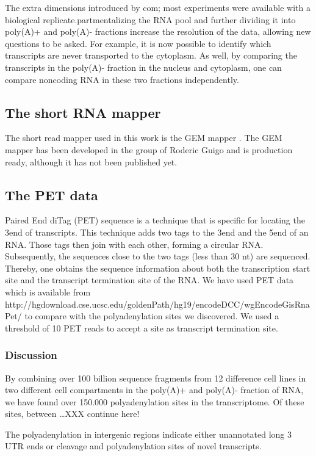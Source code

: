 The extra dimensions introduced by com; most experiments were
available with a biological replicate.partmentalizing the RNA pool and further
dividing it into poly(A)+ and poly(A)- fractions increase the resolution of the
data, allowing new questions to be asked. For example, it is now possible to
identify which transcripts are never transported to the cytoplasm. As well, by
comparing the transcripts in the poly(A)- fraction in the nucleus and
cytoplasm, one can compare noncoding RNA in these two fractions independently. 

\subsection{The short RNA mapper}
The short read mapper used in this work is the GEM mapper
\cite{ribeca_gem_2010}. The GEM mapper has been developed in the group of
Roderic Guigo and is production ready, although it has not been published yet.

\subsection{The PET data}
Paired End diTag (PET) sequence is a technique that is specific for locating
the 3\p end of transcripts. This technique adds two tags to the 3\p end and the
5\p end of an RNA. Those tags then join with each other, forming a circular
RNA. Subsequently, the sequences close to the two tags (less than 30 nt) are
sequenced. Thereby, one obtains the sequence information about both the
transcription start site and the transcript termination site of the RNA. We
have used PET data which is available from
http://hgdownload.cse.ucsc.edu/goldenPath/hg19/encodeDCC/wgEncodeGisRnaPet/ to
compare with the polyadenylation sites we discovered. We used a threshold of 10
PET reads to accept a site as transcript termination site.

\subsubsection{Discussion}
By combining over 100 billion sequence fragments from 12 difference cell lines
in two different cell compartments in the poly(A)+ and poly(A)- fraction of
RNA, we have found over 150.000 polyadenylation sites in the transcriptome. Of
these sites, between \ldots XXX continue here!

The polyadenylation in intergenic regions indicate either unannotated long 3\p
UTR ends or cleavage and polyadenylation sites of novel transcripts.

